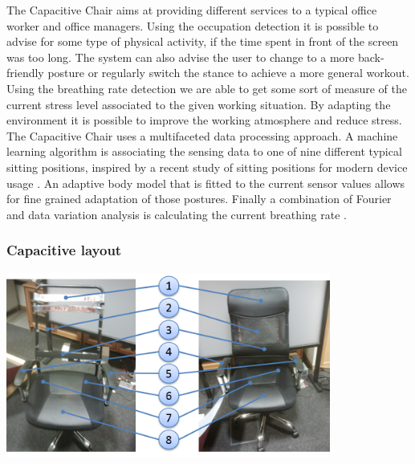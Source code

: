 The Capacitive Chair aims at providing different services to a typical office worker and office managers. Using the occupation detection it is possible to advise for some type of physical activity, if the time spent in front of the screen was too long. The system can also advise the user to change to a more back-friendly posture or regularly switch the stance to achieve a more general workout. Using the breathing rate detection we are able to get some sort of measure of the current stress level associated to the given working situation. By adapting the environment it is possible to improve the working atmosphere and reduce stress. The Capacitive Chair uses a multifaceted data processing approach. A machine learning algorithm is associating the sensing data to one of nine different typical sitting positions, inspired by a recent study of sitting positions for modern device usage \cite{globalPosture}. An adaptive body model that is fitted to the current sensor values allows for fine grained adaptation of those postures. Finally a combination of Fourier and data variation analysis is calculating the current breathing rate \cite{Braun2013ChairAid}.

\subsubsection{Capacitive layout}
\begin{minipage}{\linewidth}
\centering
\includegraphics[width=0.8\textwidth]{images/prot_capchair_electrode_layout}
\label{fig:prot_capchair_electrode_layout}
\end{minipage}

